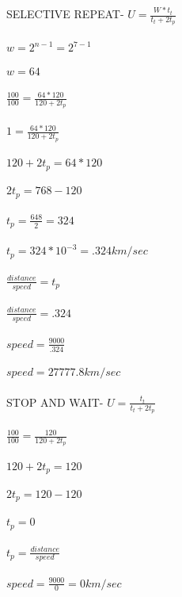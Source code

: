 \documentclass[a4paper,8pt]{article}
\begin{document}
SELECTIVE REPEAT-
$U=\frac{W*t_{t}}{t_{t}+2t_{p}}$\\\\
$w=2^{n-1}=2^{7-1}$\\\\
$w=64$\\\\
$\frac{100}{100}=\frac{64*120}{120+2t_{p}}$\\\\
$1=\frac{64*120}{120+2t_{p}}$\\\\
$120+2t_{p}=64*120$\\\\
$2t_{p}=768-120$\\\\
$t_{p}=\frac{648}{2}=324$\\\\
$t_{p}=324*10^{-3}=.324 km/sec$\\\\
$\frac{distance}{speed}=t_{p}$\\\\
$\frac{distance}{speed}=.324$\\\\
$speed=\frac{9000}{.324}$\\\\
$speed=27777.8 km/sec$\\\\

STOP AND WAIT-
$U=\frac{t_{t}}{t_{t}+2t_{p}}$\\\\
$\frac{100}{100}=\frac{120}{120+2t_{p}}$\\\\
$120+2t_{p}=120$\\\\
$2t_{p}=120-120$\\\\
$t_{p}=0$\\\\
$t_{p}=\frac{distance}{speed}$\\\\
$speed=\frac{9000}{0}=0 km/sec$\\\\
\end{document}

